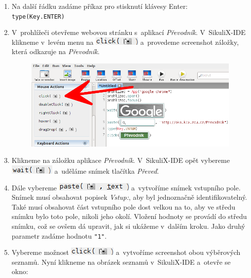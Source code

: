 \begin{enumerate}
\begin{figure}[ht!]
					\end{figure}
					\FloatBarrier
				\item Na další řádku zadáme příkaz pro stisknutí klávesy Enter:\\\texttt{type(Key.ENTER)}
				\item V~prohlížeči otevřeme webovou stránku s~aplikací \emph{Převodník}. V~SikuliX-IDE klikneme v~levém menu na \includegraphics[scale=0.7]{img/PrvniSkript/click.png} a~provedeme screenshot záložky, která odkazuje na \emph{Převodník}.
					\begin{figure}[ht!]
						\centering
						\includegraphics[width=12.5cm]{img/PrvniSkript/krok7.png}
					\end{figure}
					\FloatBarrier
				\item Klikneme na záložku aplikace \emph{Převodník}. V~SikuliX-IDE opět vybereme \includegraphics[scale=0.7]{img/PrvniSkript/wait.png} a~uděláme snímek tlačítka \emph{Převeď}.
				\item Dále vybereme \includegraphics[scale=0.7]{img/PrvniSkript/paste.png} a~vytvoříme snímek vstupního pole. Snímek musí obsahovat popisek \emph{Vstup:}, aby byl jednoznačně identifikovatelný. Také musí obsahovat část vstupního pole dost velkou na to, aby ve středu snímku bylo toto pole, nikoli jeho okolí. Vložení hodnoty se provádí do středu snímku, což se ovšem dá upravit, jak si ukážeme v~dalším kroku. Jako druhý parametr zadáme hodnotu \texttt{"1"}.
				\item Vybereme možnost \includegraphics[scale=0.7]{img/PrvniSkript/click.png} a~vytvoříme screenshot obou výběrových seznamů. Nyní klikneme na obrázek seznamů v~SikuliX-IDE a~otevře se okno:

\end{enumerate}
